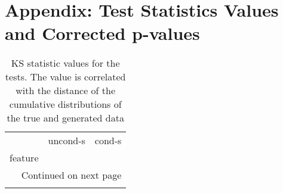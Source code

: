 \appendix
\chapter{Appendix: Test Statistics Values and Corrected p-values}
\label{sec:app-ks}
\begin{longtable}{lrr}
	\caption[KS statistic values]{ \small KS statistic values for the tests. The value is correlated with the distance of the cumulative distributions of the true and generated data}\\
	\toprule
	{} &  uncond-s &    cond-s \\
	feature                       &           &           \\
	\midrule
	\endhead
	\midrule
	\multicolumn{3}{r}{{Continued on next page}} \\
	\midrule
	\endfoot
	

\end{longtable}
